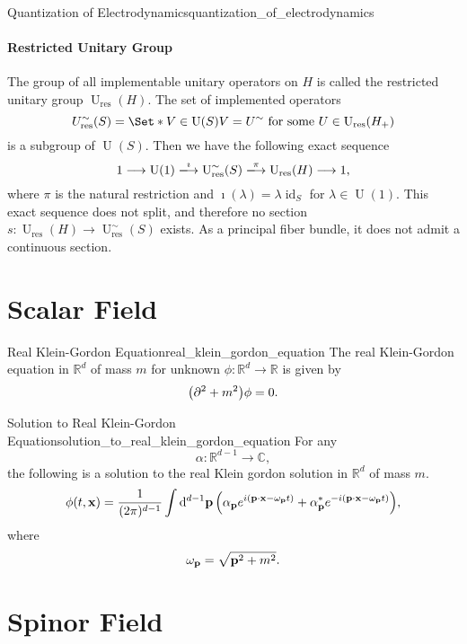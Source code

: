 \documentclass{article}
\begin{document}
\begin{example}{Quantization of Electrodynamics}{quantization_of_electrodynamics}
    \paragraph*{Restricted Unitary Group}
    The group of all implementable unitary operators on $H$ is called the restricted unitary group $\operatorname{U}_{\mathrm{res}}(H)$.
    The set of implemented operators
    \[ U^\sim_{\mathrm{res}}(S) = \Set*{V\in \operatorname{U}(S)}{V = U^\sim \text{ for some } U\in \operatorname{U}_{\mathrm{res}}(H_+)} \]
    is a subgroup of $\operatorname{U}(S)$.
    Then we have the following exact sequence
    \[ 1 \longrightarrow \operatorname{U}(1) \xlongrightarrow{\imath} \operatorname{U}^\sim_{\mathrm{res}}(S) \xlongrightarrow{\pi} \operatorname{U}_{\mathrm{res}}(H) \longrightarrow 1, \]
    where $\pi$ is the natural restriction and $\imath(\lambda) = \lambda \operatorname{id}_S$ for $\lambda \in \operatorname{U}(1)$.
    This exact sequence does not split, and therefore no section $s:\operatorname{U}_{\mathrm{res}}(H) \rightarrow \operatorname{U}^\sim_{\mathrm{res}}(S)$ exists.
    As a principal fiber bundle, it does not admit a continuous section.
\end{example}

\section{Scalar Field}

\begin{definition}{Real Klein-Gordon Equation}{real_klein_gordon_equation}
    The real Klein-Gordon equation in $\mathbb{R}^d$ of mass $m$ for unknown $\phi:\mathbb{R}^{d} \rightarrow \mathbb{R}$ is given by
    \[ \qty(\partial^2 + m^2) \phi = 0. \]
\end{definition}

\begin{theorem}{Solution to Real Klein-Gordon Equation}{solution_to_real_klein_gordon_equation}
    For any
    \[ \alpha: \mathbb{R}^{d-1} \rightarrow \mathbb{C}, \]
    the following is a solution to the real Klein gordon solution in $\mathbb{R}^d$ of mass $m$.
    \[ \phi(t,\vb{x}) = \frac{1}{(2\pi)^{d-1}} \int \dd{^{d-1} \vb{p}} \qty(\alpha_{\vb{p}} e^{i(\vb{p}\cdot \vb{x} - \omega_{\vb{p}} t)} + \alpha^*_{\vb{p}} e^{-i(\vb{p}\cdot \vb{x} - \omega_{\vb{p}} t)}), \]
    where
    \[ \omega_{\vb{p}} = \sqrt{\vb{p}^2 + m^2}. \]
\end{theorem}

\section{Spinor Field}
\end{document}
